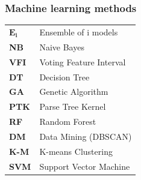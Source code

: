 \documentclass[t,12pt,pdftex]{beamer}
\begin{document}
\begin{frame}
	\frametitle{Machine learning methods}
	
\begin{table}[ht]
\centering
{}
\caption{Methods used in studies}
\label{table:meth}
\end{table}	

\begin{footnotesize}
\begin{longtable}{ll}

{$\mathbf{E_i}$} & Ensemble of i models \\
\textbf{NB} & Naive Bayes\\
\textbf{VFI} & Voting Feature Interval\\
\textbf{DT} & Decision Tree\\
\textbf{GA} & Genetic Algorithm\\
\textbf{PTK} & Parse Tree Kernel\\
\textbf{RF} & Random Forest\\
\textbf{DM} & Data Mining (DBSCAN)\\
\textbf{K-M} & K-means Clustering\\
\textbf{SVM} & Support Vector Machine

\end{longtable}
\end{footnotesize}

\end{frame}
\end{document}
